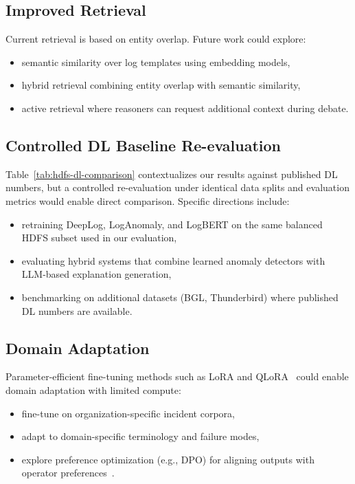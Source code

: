 \subsection{Improved Retrieval}
Current retrieval is based on entity overlap. Future work could explore:
\begin{itemize}
  \item semantic similarity over log templates using embedding models,
  \item hybrid retrieval combining entity overlap with semantic similarity,
  \item active retrieval where reasoners can request additional context during debate.
\end{itemize}

\subsection{Controlled DL Baseline Re-evaluation}
Table~\ref{tab:hdfs-dl-comparison} contextualizes our results against published DL numbers,
but a controlled re-evaluation under identical data splits and evaluation metrics would
enable direct comparison. Specific directions include:
\begin{itemize}
  \item retraining DeepLog, LogAnomaly, and LogBERT on the same balanced HDFS subset
        used in our evaluation,
  \item evaluating hybrid systems that combine learned anomaly detectors with
        LLM-based explanation generation,
  \item benchmarking on additional datasets (BGL, Thunderbird) where published DL
        numbers are available.
\end{itemize}

\subsection{Domain Adaptation}
Parameter-efficient fine-tuning methods such as LoRA and
QLoRA~\cite{hu2021loralowrankadaptationlarge,dettmers2023qloraefficientfinetuningquantized} could
enable domain adaptation with limited compute:
\begin{itemize}
  \item fine-tune on organization-specific incident corpora,
  \item adapt to domain-specific terminology and failure modes,
  \item explore preference optimization (e.g., DPO) for aligning outputs with operator
        preferences~\cite{rafailov2024directpreferenceoptimizationlanguage}.
\end{itemize}

